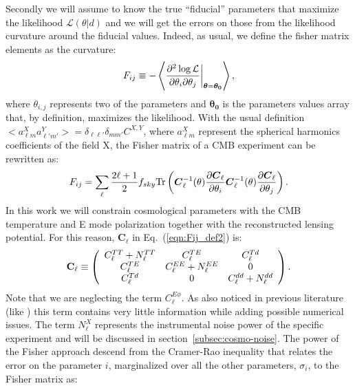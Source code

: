 \documentclass[aps,prd,reprint,superscriptaddress]{revtex4-1}
\newcommand\refeq[1]{Eq.~(\ref{eqn:#1})}
\newcommand{\refssec}[1]{section~\ref{subsec:#1}}
\begin{document}
 
Secondly we will assume to know the true ``fiducial'' parameters that maximize the likelihood $\mathcal{L}(\theta|d)$ and we will get the errors on those from the likelihood curvature around the fiducial values.
Indeed, as usual, we define the fisher matrix elements as the curvature:
\begin{equation}
	\centering
		F_{ij} \equiv - \left\langle\frac{\partial^2 \log \mathcal{L}}{\partial \theta_i \partial \theta_j} \bigg|_{\boldsymbol{\theta} = \boldsymbol{\theta_0}}\right\rangle,
	\label{eqn:Fij_def}
\end{equation}
where $\theta_{i,j}$ represents two of the parameters and $\boldsymbol{\theta_0}$ is the parameters values array that, by definition, maximizes the likelihood.
 With the usual definition \cite{} $<a_{\ell m}^{X}a_{\ell' m'}^{Y}>=\delta_{\ell \ell'}\delta_{mm'}C^{X,Y}$, where $a_{\ell m}^{X}$ represent the spherical harmonics coefficients of the field X, the Fisher matrix of a CMB experiment can be rewritten as:
\begin{equation}
 F_{ij} = \sum_\ell \frac{2\ell+1}{2} f_{sky} {\rm Tr} \left(  \boldsymbol{C}^{-1}_\ell( \theta) \frac{\partial \boldsymbol{C}_\ell}{\partial \theta_i} \boldsymbol{C}^{-1}_\ell( \theta) \frac{\partial \boldsymbol{C}_\ell}{\partial \theta_j}  \right).
 \label{eqn:Fij_def2}
 \end{equation}
 In this work we will constrain cosmological parameters with the CMB temperature and E mode polarization together with the reconstructed lensing potential. For this reason, $\boldsymbol{C}_\ell$ in \refeq{Fij_def2} is:
 \begin{eqnarray}
 	\centering
		\mathbf{C}_\ell \equiv \left( \begin{array}{ccc}C_\ell^{TT} + N_\ell^{TT} & C_\ell^{TE} & C_\ell^{Td} \\ C_\ell^{TE} & C_\ell^{EE} + N_\ell^{EE} & 0 \\ C_\ell^{Td} & 0 & C_\ell^{dd} + N_\ell^{dd}\end{array}\right).
	\label{eqn:cov_definition}
\end{eqnarray}
Note that we are neglecting the term $C_\ell^{E\phi}$. As also noticed in previous literature (like \cite{wu:2014,2013PhRvD..87h3008H}) this term contains very little information while adding possible numerical issues.
The term $N_\ell^{X}$ represents the instrumental noise power of the specific experiment and will be discussed in \refssec{cosmo-noise}.
The power of the Fisher approach descend from the Cramer-Rao inequality that relates the error on the parameter $i$, marginalized over all the other parameters, $\sigma_i$, to the Fisher matrix as:
\end{document}
